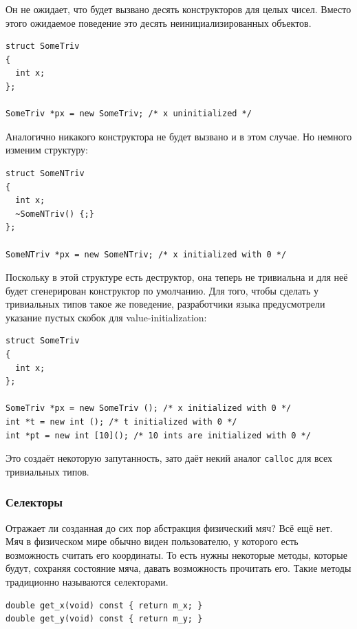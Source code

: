 \documentclass[a4paper,12pt,oneside]{article}
\begin{document}
Он не ожидает, что будет вызвано десять конструкторов для целых чисел. Вместо этого ожидаемое поведение это десять неинициализированных объектов.

\begin{lstlisting}
struct SomeTriv
{
  int x;
};

SomeTriv *px = new SomeTriv; /* x uninitialized */
\end{lstlisting}

Аналогично никакого конструктора не будет вызвано и в этом случае. Но немного изменим структуру:

\begin{lstlisting}
struct SomeNTriv
{
  int x;
  ~SomeNTriv() {;}
};

SomeNTriv *px = new SomeNTriv; /* x initialized with 0 */
\end{lstlisting}

Поскольку в этой структуре есть деструктор, она теперь не тривиальна и для неё будет сгенерирован конструктор по умолчанию. Для того, чтобы сделать у тривиальных типов такое же поведение, разработчики языка предусмотрели указание пустых скобок для value-initialization:

\begin{lstlisting}
struct SomeTriv
{
  int x;
};

SomeTriv *px = new SomeTriv (); /* x initialized with 0 */
int *t = new int (); /* t initialized with 0 */
int *pt = new int [10](); /* 10 ints are initialized with 0 */
\end{lstlisting}

Это создаёт некоторую запутанность, зато даёт некий аналог \lstinline!calloc! для всех тривиальных типов. 

\subsubsection{Селекторы}\label{Selectors}

Отражает ли созданная до сих пор абстракция физический мяч? Всё ещё нет. Мяч в физическом мире обычно виден пользователю, у которого есть возможность считать его координаты. То есть нужны некоторые методы, которые будут, сохраняя состояние мяча, давать возможность прочитать его. Такие методы традиционно называются селекторами.

\begin{lstlisting}
double get_x(void) const { return m_x; }
double get_y(void) const { return m_y; }
\end{lstlisting}
\end{document}
